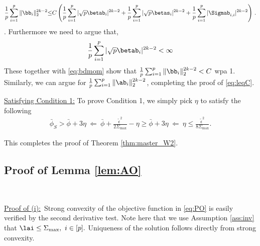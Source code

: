 \begin{align}
\frac{1}{p}\sum_{i=1}^p \|\bb_i\|_2^{2k-2} {\leq} C\left(\frac{1}{p}\sum_{i=1}^p |\sqrt{p}\betab_{i}|^{2k-2} + \frac{1}{p}\sum_{i=1}^p |\sqrt{p}\betas_{i}|^{2k-2} + \frac{1}{p}\sum_{i=1}^p |\Sigmab_{i,i}|^{2k-2} \right)\label{eq:bdmom}\,.
\end{align}
. {\color{red}Furthermore we need to argue that, 
\begin{align}
\frac{1}{p}\sum_{i=1}^p |\sqrt{p}\betab_{i}|^{2k-2} <\infty
\end{align}
}
These together with \eqref{eq:bdmom} show that $\frac{1}{p}\sum_{i=1}^p \|\bb_i\|_2^{2k-2}<C$ wpa 1. Similarly, we can argue for $\frac{1}{p}\sum_{i=1}^p \|\ab_i\|_2^{2k-2}$, completing the proof of \eqref{eq:leqC}.



\vspace{5pt}
\noindent\underline{Satisfying Condition 1:} To prove Condition 1, we simply pick $\eta$ to satisfy the following
\begin{align}
\bar\phi_S > \bar\phi + 3 \eta ~\Leftarrow~ \bar\phi + \frac{\tilde\epsilon^2}{2\Sigma_{\max}} - \eta \geq \bar\phi + 3 \eta ~\Leftarrow~ \eta \leq \frac{\tilde\epsilon^2}{8\Sigma_{\max}}.
\end{align}


This completes the proof of Theorem \ref{thm:master_W2}.

\subsection{Proof of Lemma \ref{lem:AO}}\label{sec:proofAO}

~~~~
~~~~

\vp
\noindent\underline{Proof of (i):}~Strong convexity of the objective function in \eqref{eq:PO} is easily verified by the second derivative test. Note here that we use Assumption \ref{ass:inv} that $\lai\leq\Sigma_{\max},~i\in[p].$ Uniqueness of the solution follows directly from strong convexity. 



